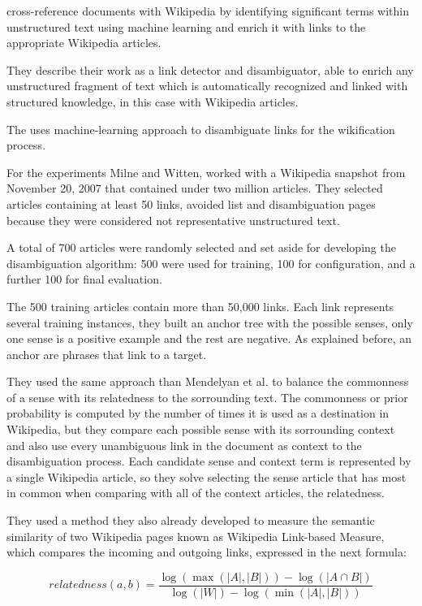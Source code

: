 cross-reference documents with Wikipedia by identifying significant terms within unstructured text using machine learning and enrich it with links to the appropriate Wikipedia articles.

They describe their work as a link detector and disambiguator, able to enrich any unstructured fragment of text which is automatically recognized and linked with structured knowledge, in this case with Wikipedia articles.

The uses machine-learning approach to disambiguate links for the wikification process.

For the experiments Milne and Witten, worked with a Wikipedia snapshot from November 20, 2007 that contained under two million articles. 
They selected articles containing at least 50 links, avoided list and disambiguation pages because they were considered not representative unstructured text. 

A total of 700 articles were randomly selected and set aside for developing the disambiguation algorithm: 500 were used for training, 100 for configuration, and a further 100 for final
evaluation.

The 500 training articles contain more than 50,000 links. Each link represents several training instances, they built an anchor tree with the possible senses, 
only one sense is a positive example and the rest are negative. As explained before, an anchor are phrases that link to a target.

They used the same approach than Mendelyan et al. to balance the commonness of a sense with its relatedness to the sorrounding text. 
The commonness or prior probability is computed by the number of times it is used as a destination in Wikipedia, but they compare each possible sense 
with its sorrounding context and also use every unambiguous link in the document as context to the disambiguation process. 
Each candidate sense and context term is represented by a single Wikipedia article, so they solve selecting the sense article that has most in 
common when comparing with all of the context articles, the relatedness. 

They used a method they also already developed \citep{AAAI:2008:milne} to measure the semantic similarity of two Wikipedia pages 
known as Wikipedia Link-based Measure, which compares the incoming and outgoing links, expressed in the next formula:

\begin{equation}
relatedness \left( a, b \right) = \frac{\log \left( \max \left( \left| A \right|, \left| B \right| \right) \right) - \log \left( \left| A \cap B \right| \right)}
                                       {\log \left( \left| W \right| \right) - \log \left( \min \left( \left| A \right|, \left| B \right| \right) \right)}
\end{equation}

